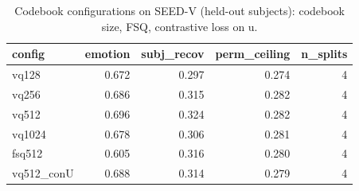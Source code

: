\begin{table}[t]
\centering
\caption{Codebook configurations on SEED-V (held-out subjects): codebook size, FSQ, contrastive loss on u.}
\label{tab:abl_seedv}
\begin{tabular}{lrrrr}
\toprule
config & emotion & subj\_recov & perm\_ceiling & n\_splits \\
\midrule
vq128 & 0.672 & 0.297 & 0.274 & 4 \\
vq256 & 0.686 & 0.315 & 0.282 & 4 \\
vq512 & 0.696 & 0.324 & 0.282 & 4 \\
vq1024 & 0.678 & 0.306 & 0.281 & 4 \\
fsq512 & 0.605 & 0.316 & 0.280 & 4 \\
vq512\_conU & 0.688 & 0.314 & 0.279 & 4 \\
\bottomrule
\end{tabular}
\end{table}